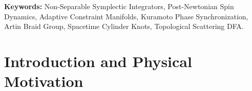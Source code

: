 \documentclass[11pt,a4paper,reqno]{article}
\theoremstyle{plain}
\theoremstyle{definition}
\theoremstyle{remark}
\numberwithin{equation}{section}
\begin{document}
\begin{abstract}
\begin{enumerate}
    \item \textbf{3D Spacetime Cylinder Braid Group $B_N$, Knots, and DFA:} We map multi-body timelike worldlines in the spacetime cylinder $\mathcal{M} = \mathbb{R} \times \Sigma$ into physical braids in the Artin braid group $B_N$. We calculate the topological winding numbers $\mathcal{W}_{ij} = \frac{1}{2\pi} \oint \mathrm{d}\arg(q_i - q_j)$, the Jones polynomial $V_{\hat{b}}(t)$ under Markov closures, and construct a 5-state Deterministic Finite Automaton ($B_N$-DFA) that strictly classifies chaotic scattering, binary-single exchanges, hyperbolic ejections, and gravitational-wave coalescences.
\end{enumerate}
Extensive numerical experiments in double precision (FP64) verify shadow Hamiltonian conservation ($\Delta H / H_0 < 10^{-8}$) and establish an order-of-magnitude reduction in constraint violation during close black hole encounters.
\end{abstract}

\vspace{1ex}
\noindent \textbf{Keywords:} Non-Separable Symplectic Integrators, Post-Newtonian Spin Dynamics, Adaptive Constraint Manifolds, Kuramoto Phase Synchronization, Artin Braid Group, Spacetime Cylinder Knots, Topological Scattering DFA.

\newpage
\tableofcontents
\newpage

\section{Introduction and Physical Motivation}
\end{document}
